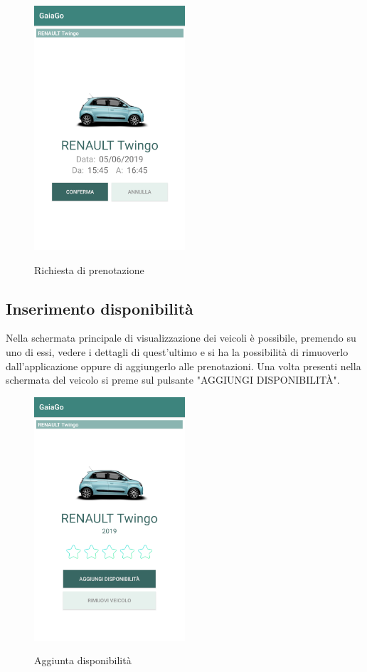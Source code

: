 \begin{itemize}
\begin{figure}[H]
		\includegraphics[width=0.5\textwidth]{res/images/conferma_prenotazione.png}\\
		\caption{Richiesta di prenotazione}
		\label{prenotazione}
	\end{figure}
\end{itemize}
\pagebreak

\subsection{Inserimento disponibilità}
Nella schermata principale di visualizzazione dei veicoli è possibile, premendo su uno di essi, vedere i dettagli di quest'ultimo e si ha la possibilità di rimuoverlo dall'applicazione oppure di aggiungerlo alle prenotazioni. Una volta presenti nella schermata del veicolo si preme sul pulsante "AGGIUNGI DISPONIBILITÀ".
	  \begin{figure}[H] 
	\centering 
	\includegraphics[width=0.5\textwidth]{res/images/aggiungi_disponibilita1.png}\\
	\caption{Aggiunta disponibilità}
	\label{disponibilità}
\end{figure}
\pagebreak

